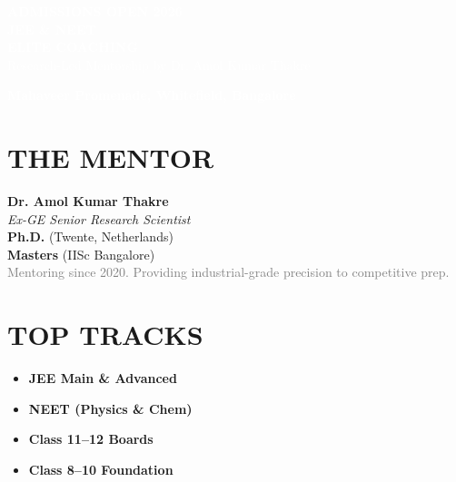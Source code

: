 \documentclass[11pt,a4paper]{article}
\begin{document}
\begin{tcolorbox}[colback=brandblue, colframe=brandblue, arc=20pt, left=30pt, right=30pt, top=40pt, bottom=40pt]
    \centering
    \textcolor{white}{\large\textbf{\faBell \quad ADMISSIONS OPEN 2026}}\\[1em]
    \textcolor{white}{\Huge\textbf{JEE \& NEET}}\\[0.2em]
    \textcolor{white}{\Huge\textbf{ELITE COACHING}}\\[1.5em]
    \textcolor{white}{\large Research-Led Mentorship by Dr. Amol Kumar Thakre}
\end{tcolorbox}

\vspace{-20pt}
\begin{center}
    \begin{tcolorbox}[colback=accentorange, colframe=accentorange, width=0.8\textwidth, arc=10pt, center]
        \centering \textcolor{white}{\textbf{\faMapMarker* \quad Mahaveer Promenade, Whitefield, Bangalore}}
    \end{tcolorbox}
\end{center}

\vspace{10pt}

\begin{minipage}[t]{0.45\textwidth}
    \section*{\textcolor{brandblue}{\faGraduationCap \quad THE MENTOR}}
    \textbf{Dr. Amol Kumar Thakre}\\
    \textit{Ex-GE Senior Research Scientist}\\
    \textbf{Ph.D.} (Twente, Netherlands)\\
    \textbf{Masters} (IISc Bangalore)\\[1em]
    \textcolor{gray}{Mentoring since 2020. Providing industrial-grade precision to competitive prep.}
\end{minipage}
\hfill
\begin{minipage}[t]{0.45\textwidth}
    \section*{\textcolor{brandblue}{\faRocket \quad TOP TRACKS}}
    \begin{itemize}[leftmargin=*, label=\textcolor{accentorange}{\faCheck}]
        \item \textbf{JEE Main \& Advanced}
        \item \textbf{NEET (Physics \& Chem)}
        \item \textbf{Class 11--12 Boards}
        \item \textbf{Class 8--10 Foundation}
    \end{itemize}
\end{minipage}
\end{document}
